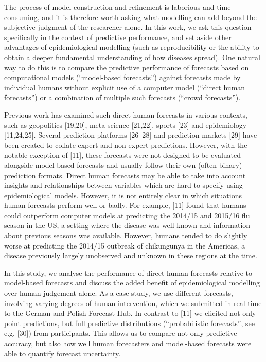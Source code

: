 \documentclass[10pt,letterpaper]{article}
\begin{document}
The process of model construction and refinement is laborious and
time-consuming, and it is therefore worth asking what modelling can add
beyond the subjective judgment of the researcher alone. In this work, we
ask this question specifically in the context of predictive performance,
and set aside other advantages of epidemiological modelling (such as
reproducibility or the ability to obtain a deeper fundamental
understanding of how diseases spread). One natural way to do this is to
compare the predictive performance of forecasts based on computational
models (``model-based forecasts'') against forecasts made by individual
humans without explicit use of a computer model (``direct human
forecasts'') or a combination of multiple such forecasts (``crowd
forecasts'').

Previous work has examined such direct human forecasts in various
contexts, such as geopolitics {[}19,20{]}, meta-science {[}21,22{]},
sports {[}23{]} and epidemiology {[}11,24,25{]}. Several prediction
platforms {[}26--28{]} and prediction markets {[}29{]} have been created
to collate expert and non-expert predictions. However, with the notable
exception of {[}11{]}, these forecasts were not designed to be evaluated
alongside model-based forecasts and usually follow their own (often
binary) prediction formats. Direct human forecasts may be able to take
into account insights and relationships between variables which are hard
to specify using epidemiological models. However, it is not entirely
clear in which situations human forecasts perform well or badly. For
example, {[}11{]} found that humans could outperform computer models at
predicting the 2014/15 and 2015/16 flu season in the US, a setting where
the disease was well known and information about previous seasons was
available. However, humans tended to do slightly worse at predicting the
2014/15 outbreak of chikungunya in the Americas, a disease previously
largely unobserved and unknown in these regions at the time.

In this study, we analyse the performance of direct human forecasts
relative to model-based forecasts and discuss the added benefit of
epidemiological modelling over human judgement alone. As a case study,
we use different forecasts, involving varying degrees of human
intervention, which we submitted in real time to the German and Polish
Forecast Hub. In contrast to {[}11{]} we elicited not only point
predictions, but full predictive distributions (``probabilistic
forecasts'', see e.g. {[}30{]}) from participants. This allows us to
compare not only predictive accuracy, but also how well human
forecasters and model-based forecasts were able to quantify forecast
uncertainty.
\end{document}
